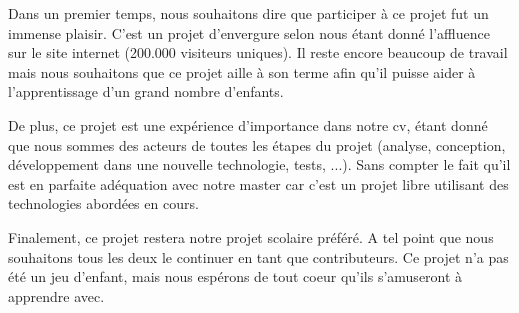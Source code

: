 Dans un premier temps, nous souhaitons dire que participer à ce projet fut un immense plaisir. C'est un projet d'envergure selon nous étant donné l'affluence sur le site internet (200.000 visiteurs uniques). Il reste encore beaucoup de travail mais nous souhaitons que ce projet aille à son terme afin qu'il puisse aider à l'apprentissage d'un grand nombre d'enfants.

De plus, ce projet est une expérience d'importance dans notre cv, étant donné que nous sommes des acteurs de toutes les étapes du projet (analyse, conception, développement dans une nouvelle technologie, tests, ...).
Sans compter le fait qu'il est en parfaite adéquation avec notre master car c'est un projet libre utilisant des technologies abordées en cours.

Finalement, ce projet restera notre projet scolaire préféré. A tel point que nous souhaitons tous les deux le continuer en tant que contributeurs. Ce projet n'a pas été un jeu d'enfant, mais nous espérons de tout coeur qu'ils s'amuseront à apprendre avec.
